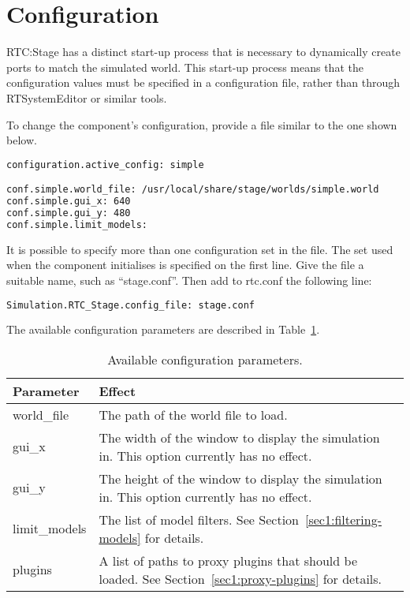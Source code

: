 \documentclass[a4paper,10pt]{article}
\begin{document}
\section{Configuration}
\label{sec:configuration}

RTC:Stage has a distinct start-up process that is necessary to dynamically
create ports to match the simulated world. This start-up process means that the
configuration values must be specified in a configuration file, rather than
through RTSystemEditor or similar tools.

To change the component's configuration, provide a file similar to the one
shown below.

\begin{lstlisting}[frame=tb, language=bash]
configuration.active_config: simple

conf.simple.world_file: /usr/local/share/stage/worlds/simple.world
conf.simple.gui_x: 640
conf.simple.gui_y: 480
conf.simple.limit_models:
\end{lstlisting}

It is possible to specify more than one configuration set in the file. The set
used when the component initialises is specified on the first line. Give the
file a suitable name, such as ``stage.conf''. Then add to rtc.conf the
following line:

\begin{lstlisting}[frame=tb, language=bash]
Simulation.RTC_Stage.config_file: stage.conf
\end{lstlisting}

The available configuration parameters are described in
Table~\ref{tab:config_params}.

\begin{table}[t]
  \centering
  \begin{tabularx}{\columnwidth}{lX}
    \toprule
    Parameter & Effect \\
    \midrule
    world\_file & The path of the world file to load. \\
    gui\_x & The width of the window to display the simulation in. This option currently has no effect. \\
    gui\_y & The height of the window to display the simulation in. This option currently has no effect. \\
    limit\_models & The list of model filters. See Section~\ref{sec1:filtering-models} for details. \\
    plugins & A list of paths to proxy plugins that should be loaded. See Section~\ref{sec1:proxy-plugins} for details. \\
    \bottomrule
  \end{tabularx}
  \caption{Available configuration parameters.}
  \label{tab:config_params}
\end{table}
\end{document}
